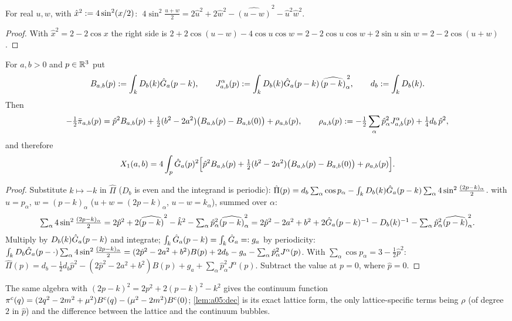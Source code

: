 \begin{lemma}\label{lem:a05:trig}
For real $u,w$, with $\hat x^2:=4\sin^2(x/2)$: $\;4\sin^2\frac{u+w}2=2\hat u^2+2\hat w^2-\widehat{(u-w)}^2-\hat u^2\hat w^2$.
\end{lemma}
\begin{proof}
With $\hat x^2=2-2\cos x$ the right side is $2+2\cos(u-w)-4\cos u\cos w=2-2\cos u\cos w+2\sin u\sin w=2-2\cos(u+w)$.
\end{proof}

\begin{lemma}\label{lem:a05:dec}
For $a,b>0$ and $p\in\mathbb R^3$ put
\[
B_{a,b}(p):=\int_{k} D_b(k)\hat G_a(p-k),\qquad J^\alpha_{a,b}(p):=\int_{k} D_b(k)\hat G_a(p-k)\,\widehat{(p-k)}_\alpha^{\,2},\qquad d_b:=\int_{k} D_b(k).
\]
Then
\[
-\tfrac12\bar\pi_{a,b}(p)=\hat p^2B_{a,b}(p)+\tfrac12(b^2-2a^2)\big(B_{a,b}(p)-B_{a,b}(0)\big)+\rho_{a,b}(p),\qquad
\rho_{a,b}(p):=-\tfrac12\sum_\alpha\hat p_\alpha^2J^\alpha_{a,b}(p)+\tfrac14d_b\,\hat p^2,
\]
and therefore
\[
X_1(a,b)=4\int_{p}\hat G_a(p)^2\Big[\hat p^2B_{a,b}(p)+\tfrac12(b^2-2a^2)\big(B_{a,b}(p)-B_{a,b}(0)\big)+\rho_{a,b}(p)\Big].
\]
\end{lemma}
\begin{proof}
Substitute $k\mapsto-k$ in $\hat\Pi$ ($D_b$ is even and the integrand is periodic): $\hat\Pi(p)=d_b\sum_\alpha\cos p_\alpha-\int_{k} D_b(k)\hat G_a(p-k)\sum_\alpha4\sin^2\frac{(2p-k)_\alpha}2$.  with $u=p_\alpha$, $w=(p-k)_\alpha$ ($u+w=(2p-k)_\alpha$, $u-w=k_\alpha$), summed over $\alpha$:
\[
\textstyle\sum_\alpha4\sin^2\frac{(2p-k)_\alpha}2=2\hat p^2+2\widehat{(p-k)}^2-\hat k^2-\sum_\alpha\hat p_\alpha^2\widehat{(p-k)}_\alpha^2
=2\hat p^2-2a^2+b^2+2\hat G_a(p-k)^{-1}-D_b(k)^{-1}-\sum_\alpha\hat p_\alpha^2\widehat{(p-k)}_\alpha^2 .
\]
Multiply by $D_b(k)\hat G_a(p-k)$ and integrate; $\int_{k}\hat G_a(p-k)=\int_{k}\hat G_a=:g_a$ by periodicity:
$\int_{k} D_b\hat G_a(p-\cdot)\sum_\alpha4\sin^2\frac{(2p-k)_\alpha}2=(2\hat p^2-2a^2+b^2)B(p)+2d_b-g_a-\sum_\alpha\hat p_\alpha^2J^\alpha(p)$. With $\sum_\alpha\cos p_\alpha=3-\frac12\hat p^2$:
$\hat\Pi(p)=d_b-\frac12d_b\hat p^2-(2\hat p^2-2a^2+b^2)B(p)+g_a+\sum_\alpha\hat p_\alpha^2J^\alpha(p)$. Subtract the value at $p=0$, where $\hat p=0$.
\end{proof}

The same algebra with $(2p-k)^2=2p^2+2(p-k)^2-k^2$ gives the continuum function $\pi^{\rm c}(q)=(2q^2-2m^2+\mu^2)B^{\mathrm c}(q)-(\mu^2-2m^2)B^{\mathrm c}(0)$; \cref{lem:a05:dec} is its exact lattice form, the only lattice-specific terms being $\rho$ (of degree $2$ in $\hat p$) and the difference between the lattice and the continuum bubbles.

